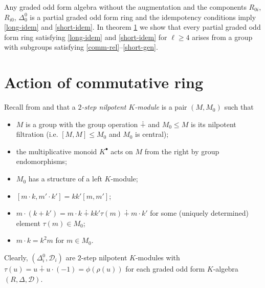 \documentclass{article}
\theoremstyle{definition}
\begin{document}
Any graded odd form algebra without the augmentation and the components \(R_{0i}\), \(R_{i0}\), \(\Delta^0_0\) is a partial graded odd form ring and the idempotency conditions imply \ref{long-idem} and \ref{short-idem}. In theorem \ref{} we show that every partial graded odd form ring satisfying \ref{long-idem} and \ref{short-idem} for \(\ell \geq 4\) arises from a group with subgroups satisfying \ref{comm-rel}--\ref{short-gen}.



\section{Action of commutative ring}

Recall from \cite[\S 2.1]{thesis} and \cite[\S 4]{classic-ofa} that a \textit{\(2\)-step nilpotent \(K\)-module} is a pair \((M, M_0)\) such that
\begin{itemize}

    \item \(M\) is a group with the group operation \(\dotplus\) and \(M_0 \leq M\) is its nilpotent filtration (i.e. \(
        [M, M] \leq M_0
    \) and \(M_0\) is central);

    \item the multiplicative monoid \(K^\bullet\) acts on \(M\) from the right by group endomorphisms;

    \item \(M_0\) has a structure of a left \(K\)-module;

    \item \(
        [m \cdot k, m' \cdot k'] = kk' [m, m']
    \);

    \item \(
        m \cdot (k + k')
        =
        m \cdot k
        \dotplus kk' \tau(m)
        \dotplus m \cdot k'
    \) for some (uniquely determined) element \(
        \tau(m) \in M_0
    \);

    \item \(
        m \cdot k = k^2 m
    \) for \(m \in M_0\).

\end{itemize}
Clearly, \(
    (\Delta^0_i, \mathcal D_i)
\) are \(2\)-step nilpotent \(K\)-modules with \(
    \tau(u) = u \dotplus u \cdot (-1) = \phi(\rho(u))
\) for each graded odd form \(K\)-algebra \(
    (R, \Delta, \mathcal D)
\).
\end{document}
